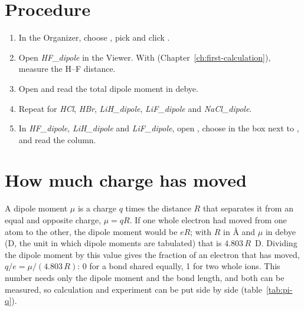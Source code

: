 \section{Procedure}
\begin{enumerate}
	\item In the Organizer, choose , pick  and click .
	\item Open \emph{HF\_dipole} in the Viewer. With  (Chapter~\ref{ch:first-calculation}), measure the H--F distance.
	\item Open  and read the total dipole moment in debye.
	\item Repeat for \emph{HCl}, \emph{HBr}, \emph{LiH\_dipole}, \emph{LiF\_dipole} and \emph{NaCl\_dipole}.
	\item In \emph{HF\_dipole}, \emph{LiH\_dipole} and \emph{LiF\_dipole}, open , choose  in the box next to , and read the  column.
\end{enumerate}

\section{How much charge has moved}
A dipole moment $\mu$ is a charge $q$ times the distance $R$ that separates it from an equal and opposite charge, $\mu = qR$. If one whole electron had moved from one atom to the other, the dipole moment would be $eR$; with $R$ in \AA{} and $\mu$ in debye (D, the unit in which dipole moments are tabulated) that is $4.803\,R$~D. Dividing the dipole moment by this value gives the fraction of an electron that has moved, $q/e = \mu/(4.803\,R)$: 0 for a bond shared equally, 1 for two whole ions. This number needs only the dipole moment and the bond length, and both can be measured, so calculation and experiment can be put side by side (table~\ref{tab:pi-q}).

